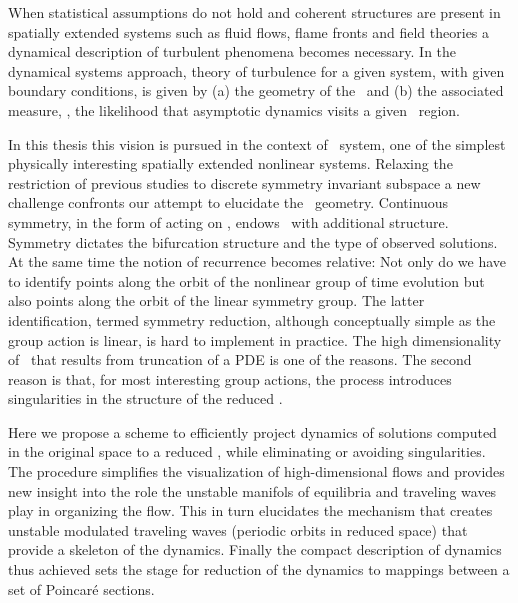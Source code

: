 
When statistical assumptions do not hold and coherent
structures are present in spatially extended systems
such as fluid flows, flame fronts and field theories
a dynamical description of turbulent phenomena becomes
necessary.
In the dynamical systems approach,
theory of turbulence for a given system, with given boundary conditions,
is given by (a) the geometry of the \statesp\ and (b) the associated measure,
\ie, the likelihood that asymptotic dynamics visits a given \statesp\ region.

In this thesis this vision is pursued in the context of \KS\
system, one of the simplest physically interesting spatially
extended nonlinear systems. Relaxing the restriction of
previous studies to discrete
symmetry invariant subspace a new challenge confronts our
attempt to elucidate the \statesp\ geometry. Continuous
symmetry, in the form of  acting on
\statesp, endows \statesp\ with additional structure.
Symmetry dictates the bifurcation structure and the type of
observed solutions. At the same time the notion of recurrence becomes
relative: Not only do we have to identify points along the
orbit of the nonlinear group of time evolution but also points
along the orbit of the linear symmetry group. The latter
identification, termed symmetry reduction, although
conceptually simple as the group action is linear, is hard to
implement in practice. The high dimensionality of \statesp\
that results from truncation of a PDE is one of the reasons.
The second reason is that, for most interesting group actions,
the process introduces singularities in the structure of the
reduced \statesp.

Here we propose a scheme to efficiently project dynamics of
solutions computed in the original space to a reduced \statesp,
while eliminating or avoiding singularities. The procedure simplifies
the visualization of high-dimensional flows and provides new
insight into the role the unstable manifols of equilibria and
traveling waves play in organizing the flow. This in turn elucidates the mechanism
that creates unstable modulated traveling waves (periodic orbits in reduced space)
that provide a skeleton of the dynamics. Finally the compact description
of dynamics thus achieved sets the stage for
reduction of the dynamics to mappings between a set of Poincar\'e sections.
